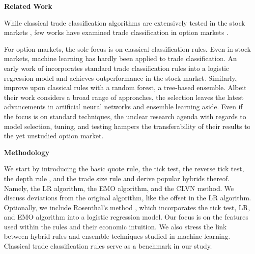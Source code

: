 \textbf{Related Work}

While classical trade classification algorithms are extensively tested in the stock markets \autocites[e.~g.,][]{chakrabartyTradeClassificationAlgorithms2012}{odders-whiteOccurrenceConsequencesInaccurate2000}, few works have examined trade classification in option markets \autocites{grauerOptionTradeClassification2022}{savickasInferringDirectionOption2003}.

For option markets, the sole focus is on classical classification rules. Even in stock markets, machine learning has hardly been applied to trade classification. An early work of \textcite{rosenthalModelingTradeDirection2012} incorporates standard trade classification rules into a logistic regression model and achieves outperformance in the stock market. Similarly, \textcites{fedeniaMachineLearningCorporate2021}{ronenMachineLearningTrade2022} improve upon classical rules with a random forest, a tree-based ensemble. Albeit their work considers a broad range of approaches, the selection leaves the latest advancements in artificial neural networks and ensemble learning aside. Even if the focus is on standard techniques, the unclear research agenda with regards to model selection, tuning, and testing hampers the transferability of their results to the yet unstudied option market. 

\textbf{Methodology}

We start by introducing the basic quote rule, the tick test, the reverse tick test, the depth rule \autocite{grauerOptionTradeClassification2022}, and the trade size rule \autocite{grauerOptionTradeClassification2022} and derive popular hybrids thereof. Namely, the LR algorithm, the EMO algorithm, and the  CLVN method. We discuss deviations from the original algorithm, like the offset in the LR algorithm. Optionally, we include Rosenthal's method \autocite{rosenthalModelingTradeDirection2012}, which incorporates the tick test, LR, and EMO algorithm into a logistic regression model. Our focus is on the features used within the rules and their economic intuition. We also stress the link between hybrid rules and ensemble techniques studied in machine learning. Classical trade classification rules serve as a benchmark in our study.

